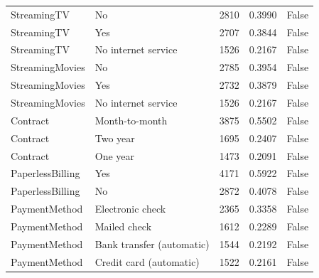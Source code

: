 \begin{tabular}{llrrr}
StreamingTV & No & 2810 & 0.3990 & False \\
StreamingTV & Yes & 2707 & 0.3844 & False \\
StreamingTV & No internet service & 1526 & 0.2167 & False \\
StreamingMovies & No & 2785 & 0.3954 & False \\
StreamingMovies & Yes & 2732 & 0.3879 & False \\
StreamingMovies & No internet service & 1526 & 0.2167 & False \\
Contract & Month-to-month & 3875 & 0.5502 & False \\
Contract & Two year & 1695 & 0.2407 & False \\
Contract & One year & 1473 & 0.2091 & False \\
PaperlessBilling & Yes & 4171 & 0.5922 & False \\
PaperlessBilling & No & 2872 & 0.4078 & False \\
PaymentMethod & Electronic check & 2365 & 0.3358 & False \\
PaymentMethod & Mailed check & 1612 & 0.2289 & False \\
PaymentMethod & Bank transfer (automatic) & 1544 & 0.2192 & False \\
PaymentMethod & Credit card (automatic) & 1522 & 0.2161 & False \\
\bottomrule
\end{tabular}

